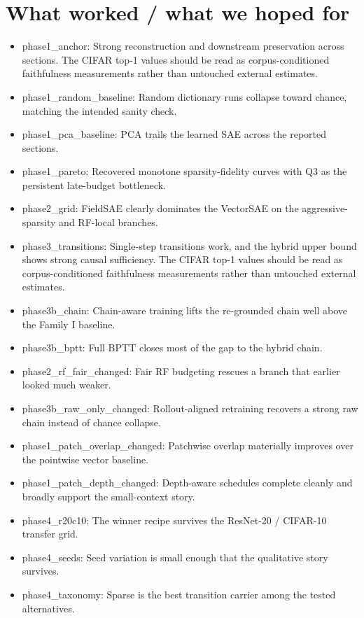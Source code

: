 \documentclass[11pt]{article}
\begin{document}
\section{What worked / what we hoped for}
\begin{itemize}
\item phase1\_anchor: Strong reconstruction and downstream preservation across sections. The CIFAR top-1 values should be read as corpus-conditioned faithfulness measurements rather than untouched external estimates.
\item phase1\_random\_baseline: Random dictionary runs collapse toward chance, matching the intended sanity check.
\item phase1\_pca\_baseline: PCA trails the learned SAE across the reported sections.
\item phase1\_pareto: Recovered monotone sparsity-fidelity curves with Q3 as the persistent late-budget bottleneck.
\item phase2\_grid: FieldSAE clearly dominates the VectorSAE on the aggressive-sparsity and RF-local branches.
\item phase3\_transitions: Single-step transitions work, and the hybrid upper bound shows strong causal sufficiency. The CIFAR top-1 values should be read as corpus-conditioned faithfulness measurements rather than untouched external estimates.
\item phase3b\_chain: Chain-aware training lifts the re-grounded chain well above the Family I baseline.
\item phase3b\_bptt: Full BPTT closes most of the gap to the hybrid chain.
\item phase2\_rf\_fair\_changed: Fair RF budgeting rescues a branch that earlier looked much weaker.
\item phase3b\_raw\_only\_changed: Rollout-aligned retraining recovers a strong raw chain instead of chance collapse.
\item phase1\_patch\_overlap\_changed: Patchwise overlap materially improves over the pointwise vector baseline.
\item phase1\_patch\_depth\_changed: Depth-aware schedules complete cleanly and broadly support the small-context story.
\item phase4\_r20c10: The winner recipe survives the ResNet-20 / CIFAR-10 transfer grid.
\item phase4\_seeds: Seed variation is small enough that the qualitative story survives.
\item phase4\_taxonomy: Sparse is the best transition carrier among the tested alternatives.

\end{itemize}
\end{document}
